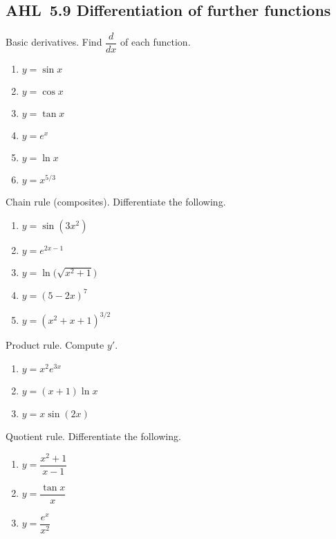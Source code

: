 \documentclass[11pt]{article}
\def\textbf#1{#1}%
\newcommand{\tocsubsection}[1]{\subsection{#1}}
\newcounter{question}
\begin{document}
\tocsubsection{AHL 5.9 \; Differentiation of further functions}


\begin{question}
\textbf{Basic derivatives.} Find $\dfrac{d}{dx}$ of each function.
\begin{enumerate}
  \item $y=\sin x$
  \item $y=\cos x$
  \item $y=\tan x$
  \item $y=e^{x}$
  \item $y=\ln x$
  \item $y=x^{5/3}$
\end{enumerate}
\end{question}

\begin{question}
\textbf{Chain rule (composites).} Differentiate the following.
\begin{enumerate}
  \item $y=\sin(3x^{2})$
  \item $y=e^{2x-1}$
  \item $y=\ln\!\big(\sqrt{x^{2}+1}\big)$
  \item $y=(5-2x)^{7}$
  \item $y=(x^{2}+x+1)^{3/2}$
\end{enumerate}
\end{question}

\begin{question}
\textbf{Product rule.} Compute $y'$.
\begin{enumerate}
  \item $y=x^{2}e^{3x}$
  \item $y=(x+1)\ln x$
  \item $y=x\sin(2x)$
\end{enumerate}
\end{question}

\begin{question}
\textbf{Quotient rule.} Differentiate the following.
\begin{enumerate}
  \item $y=\dfrac{x^{2}+1}{x-1}$
  \item $y=\dfrac{\tan x}{x}$
  \item $y=\dfrac{e^{x}}{x^{2}}$
\end{enumerate}
\end{question}
\end{document}
